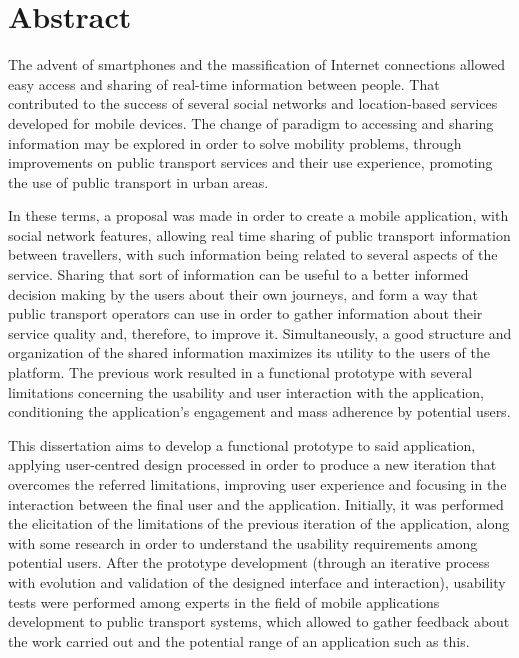 \chapter*{Abstract}

The advent of smartphones and the massification of Internet connections allowed easy access and sharing of real-time information between people. That contributed to the success of several social networks and location-based services developed for mobile devices. The change of paradigm to accessing and sharing information may be explored in order to solve mobility problems, through improvements on public transport services and their use experience, promoting the use of public transport in urban areas.

In these terms, a proposal was made in order to create a mobile application, with social network features, allowing real time sharing of public transport information between travellers, with such information being related to several aspects of the service. Sharing that sort of information can be useful to a better informed decision making by the users about their own journeys, and form a way that public transport operators can use in order to gather information about their service quality and, therefore, to improve it. Simultaneously, a good structure and organization of the shared information maximizes its utility to the users of the platform. The previous work resulted in a functional prototype with several limitations concerning the usability and user interaction with the application, conditioning the application's engagement and mass adherence by potential users.

This dissertation aims to develop a functional prototype to said application, applying user-centred design processed in order to produce a new iteration that overcomes the referred limitations, improving user experience and focusing in the interaction between the final user and the application. Initially, it was performed the elicitation of the limitations of the previous iteration of the application, along with some research in order to understand the usability requirements among potential users. After the prototype development (through an iterative process with evolution and validation of the designed interface and interaction), usability tests were performed among experts in the field of mobile applications development to public transport systems, which allowed to gather feedback about the work carried out and the potential range of an application such as this.

